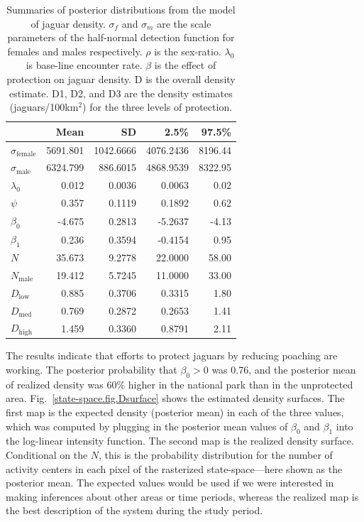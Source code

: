 \begin{table}
\centering
\caption{Summaries of posterior distributions from the model of jaguar
  density. $\sigma_f$ and $\sigma_m$ are the scale parameters of
  the half-normal detection function for females and males
  respectively. $\rho$ is the
  sex-ratio. $\lambda_0$ is base-line encounter rate. $\beta$ is the
  effect of protection on jaguar density. D is the overall density
  estimate. D1, D2, and D3 are the density estimates
  (jaguars/100km$^2$) for the three levels of protection. }
\begin{tabular}{lrrrr}
\hline
& Mean & SD & 2.5\% & 97.5\% \\
\hline
 $\sigma_\text{female}$ 	& 5691.801 	& 1042.6666 	& 4076.2436 	& 8196.44 \\
 $\sigma_\text{male}$ 	& 6324.799 	&  886.6015 	& 4868.9539 	& 8322.95 \\
 $\lambda_0$ 	&    0.012 	&    0.0036 	&    0.0063 	&    0.02 \\
 $\psi$ 	&    0.357 	&    0.1119 	&    0.1892 	&    0.62 \\
 $\beta_0$ 	&   -4.675 	&    0.2813 	&   -5.2637 	&   -4.13 \\
 $\beta_1$ 	&    0.236 	&    0.3594 	&   -0.4154 	&    0.95 \\
 $N$ 	&   35.673 	&    9.2778 	&   22.0000 	&   58.00 \\
 $N_\text{male}$ 	&   19.412 	&    5.7245 	&   11.0000 	&   33.00 \\
 $D_\text{low}$ 	&    0.885 	&    0.3706 	&    0.3315 	&    1.80 \\
 $D_\text{med}$ 	&    0.769 	&    0.2872 	&    0.2653 	&    1.41 \\
 $D_\text{high}$ 	&    1.459 	&    0.3360 	&    0.8791 	&    2.11 \\
 \hline
\end{tabular}
\label{state-space.tab.jagposts}
\end{table}

The results indicate that efforts to protect jaguars by reducing poaching are
working. The posterior probability that $\beta_0 > 0$ was 0.76, and
the posterior mean of realized density was 60\% higher in the national park than in the
unprotected area. Fig.~\ref{state-space.fig.Dsurface} shows the estimated
density surfaces. The first map is the expected density (posterior mean) in each of
the three values, which was computed by plugging in the posterior mean
values of $\beta_0$ and $\beta_1$ into the log-linear intensity
function. The second map is the realized density surface. Conditional
on the $N$, this is the probability distribution for the
number of activity centers in each pixel of the rasterized
state-space---here shown as the posterior mean. The expected values
would be used if we were interested in making inferences about other
areas or time periods, whereas the realized map is the best
description of the system during the study period.

